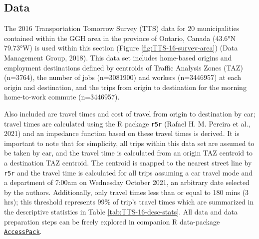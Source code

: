 \documentclass[]{elsarticle} %
\begin{document}
\hypertarget{data}{%
\subsection{Data}\label{data}}

The 2016 Transportation Tomorrow Survey (TTS) data for 20 municipalities
contained within the GGH area in the province of Ontario, Canada (43.6°N
79.73°W) is used within this section (Figure
\ref{fig:TTS-16-survey-area}) (Data Management Group, 2018). This data
set includes home-based origins and employment destinations defined by
centroids of Traffic Analysis Zones (TAZ) (n=3764), the number of jobs
(n=3081900) and workers (n=3446957) at each origin and destination, and
the trips from origin to destination for the morning home-to-work
commute (n=3446957).

Also included are travel times and cost of travel from origin to
destination by car; travel times are calculated using the R package
\texttt{r5r} (Rafael H. M. Pereira et al., 2021) and an impedance
function based on these travel times is derived. It is important to note
that for simplicity, all trips within this data set are assumed to be
taken by car, and the travel time is calculated from an origin TAZ
centroid to a destination TAZ centroid. The centroid is snapped to the
nearest street line by \texttt{r5r} and the travel time is calculated
for all trips assuming a car travel mode and a department of 7:00am on
Wednesday October 2021, an arbitrary date selected by the authors.
Additionally, only travel times less than or equal to 180 mins (3 hrs);
this threshold represents 99\% of trip's travel times which are
summarized in the descriptive statistics in Table
\ref{tab:TTS-16-desc-stats}. All data and data preparation steps can be
freely explored in companion R data-package
\href{https://github.com/soukhova/AccessPack}{\texttt{AccessPack}}.
\end{document}
